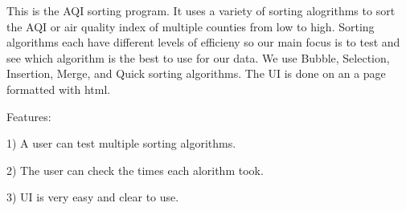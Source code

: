 This is the A\+Q\+I sorting program. It uses a variety of sorting alogrithms to sort the A\+Q\+I or air quality index of multiple counties from low to high. Sorting algorithms each have different levels of efficieny so our main focus is to test and see which algorithm is the best to use for our data. We use Bubble, Selection, Insertion, Merge, and Quick sorting algorithms. The U\+I is done on an a page formatted with html.

Features\+:

1) A user can test multiple sorting algorithms.

2) The user can check the times each alorithm took.

3) U\+I is very easy and clear to use. 